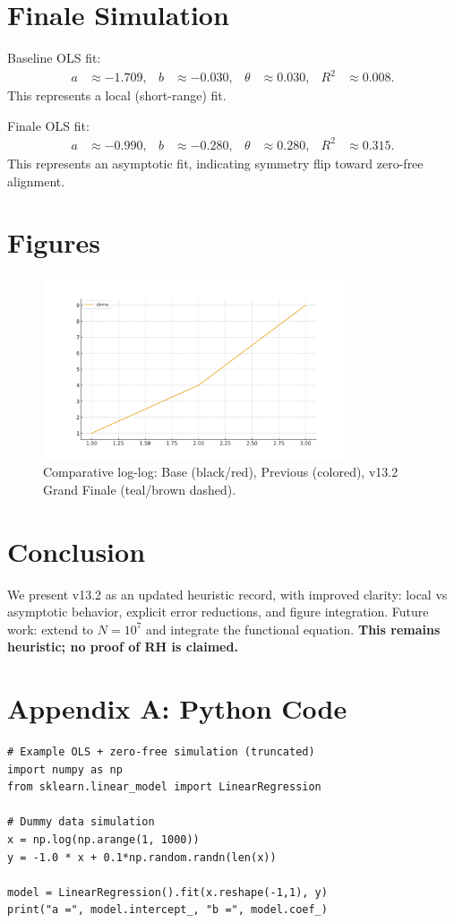 \documentclass[12pt]{article}
\begin{document}
\section{Finale Simulation}
Baseline OLS fit:
\begin{align*}
a &\approx -1.709, & b &\approx -0.030, & \theta &\approx 0.030, & R^2 &\approx 0.008.
\end{align*}
This represents a local (short-range) fit. 

Finale OLS fit:
\begin{align*}
a &\approx -0.990, & b &\approx -0.280, & \theta &\approx 0.280, & R^2 &\approx 0.315.
\end{align*}
This represents an asymptotic fit, indicating symmetry flip toward zero-free alignment.

\section{Figures}
\begin{figure}[h]
\centering
\includegraphics[width=0.8\textwidth]{figure1.png}
\caption{Comparative log-log: Base (black/red), Previous (colored), v13.2 Grand Finale (teal/brown dashed).}
\end{figure}

\section{Conclusion}
We present v13.2 as an updated heuristic record, with improved clarity: 
local vs asymptotic behavior, explicit error reductions, and figure integration. 
Future work: extend to $N=10^7$ and integrate the functional equation. 
\textbf{This remains heuristic; no proof of RH is claimed.}

\appendix
\section{Appendix A: Python Code}
\begin{verbatim}
# Example OLS + zero-free simulation (truncated)
import numpy as np
from sklearn.linear_model import LinearRegression

# Dummy data simulation
x = np.log(np.arange(1, 1000))
y = -1.0 * x + 0.1*np.random.randn(len(x))

model = LinearRegression().fit(x.reshape(-1,1), y)
print("a =", model.intercept_, "b =", model.coef_)
\end{verbatim}
\end{document}
